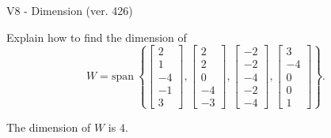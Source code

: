 \begin{exercise}
  \begin{exerciseTitle}V8 - Dimension (ver. 426)\end{exerciseTitle}
  \begin{exerciseStatement}
    Explain how to find the dimension of 
\[W=\mathrm{span}\ \left\{\left[\begin{array}{r}
2 \\
1 \\
-4 \\
-1 \\
3
\end{array}\right] , \left[\begin{array}{r}
2 \\
2 \\
0 \\
-4 \\
-3
\end{array}\right] , \left[\begin{array}{r}
-2 \\
-2 \\
-4 \\
-2 \\
-4
\end{array}\right] , \left[\begin{array}{r}
3 \\
-4 \\
0 \\
0 \\
1
\end{array}\right]\right\}.\]



  \end{exerciseStatement}
  \begin{exerciseAnswer}
   The dimension of \(W\) is  \(4\).
  


  \end{exerciseAnswer}
\end{exercise}
